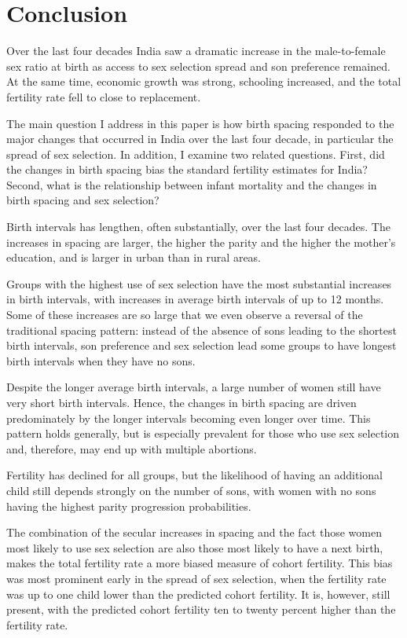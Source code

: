 \documentclass[12pt,letterpaper]{article}
\begin{document}
\section{Conclusion\label{sec:conclusion}}

Over the last four decades India saw a dramatic increase in the male-to-female
sex ratio at birth as access to sex selection spread and son preference remained. 
At the same time, economic growth was strong, schooling increased, and the total
fertility rate fell to close to replacement.

The main question I address in this paper is how birth spacing responded to the major changes
that occurred in India over the last four decade, in particular the spread of sex selection.
In addition, I examine two related questions.
First, did the changes in birth spacing bias the standard fertility estimates for India? 
Second, what is the relationship between infant mortality and the changes in birth spacing 
and sex selection?


Birth intervals has lengthen, often substantially, over the last four decades.
The increases in spacing are larger, the higher the parity and the higher the mother's
education, and is larger in urban than in rural areas.

Groups with the highest use of sex selection have the most substantial increases in 
birth intervals, with increases in average birth intervals of up to 12 months. 
Some of these increases are so large that we even observe a reversal of the traditional 
spacing pattern: instead of the absence of sons leading to the shortest birth intervals, 
son preference and sex selection lead some groups to have longest birth intervals when
they have no sons.

Despite the longer average birth intervals, a large number of women still have very 
short birth intervals. 
Hence, the changes in birth spacing are driven predominately by the longer intervals 
becoming even longer over time.
This pattern holds generally, but is especially prevalent for those who use sex selection 
and, therefore, may end up with multiple abortions. 

Fertility has declined for all groups, but the likelihood of having an additional child
still depends strongly on the number of sons, with women with no sons having the highest 
parity progression probabilities.

The combination of the secular increases in spacing and the fact those women most likely to use
sex selection are also those most likely to have a next birth, makes the total fertility rate a 
more biased measure of cohort fertility. 
This bias was most prominent early in the spread of sex selection, when the fertility rate 
was up to one child lower than the predicted cohort fertility. 
It is, however, still present, with the predicted cohort fertility ten to twenty percent 
higher than the fertility rate.
\end{document}
